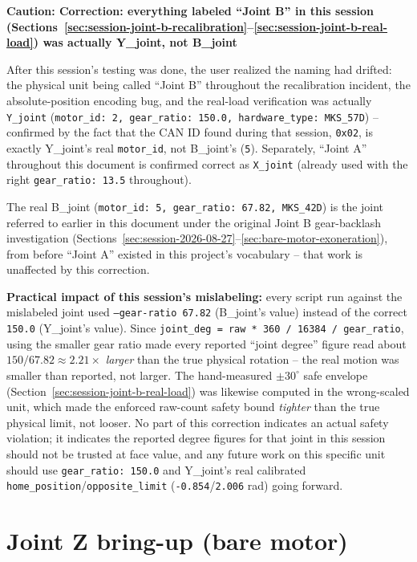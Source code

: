 \documentclass[11pt,letterpaper]{article}
\newenvironment{caution}[1]{%
    \par\addvspace{8pt}%
    \noindent{\color{cautionred}\rule{\linewidth}{0.8pt}}\par\vspace{2pt}
    \noindent\textbf{\color{cautionred}Caution: #1}\par\vspace{2pt}
}{%
    \par\vspace{2pt}\noindent{\color{cautionred}\rule{\linewidth}{0.4pt}}%
    \par\addvspace{8pt}%
}
\begin{document}
\begin{caution}{Correction: everything labeled ``Joint B'' in this session (Sections~\ref{sec:session-joint-b-recalibration}--\ref{sec:session-joint-b-real-load}) was actually Y\_joint, not B\_joint}
After this session's testing was done, the user realized the naming had drifted: the physical unit being called ``Joint B'' throughout the recalibration incident, the absolute-position encoding bug, and the real-load verification was actually \texttt{Y\_joint} (\texttt{motor\_id: 2, gear\_ratio: 150.0, hardware\_type: MKS\_57D}) -- confirmed by the fact that the CAN ID found during that session, \texttt{0x02}, is exactly Y\_joint's real \texttt{motor\_id}, not B\_joint's (\texttt{5}). Separately, ``Joint A'' throughout this document is confirmed correct as \texttt{X\_joint} (already used with the right \texttt{gear\_ratio: 13.5} throughout).

The real B\_joint (\texttt{motor\_id: 5, gear\_ratio: 67.82, MKS\_42D}) is the joint referred to earlier in this document under the original Joint B gear-backlash investigation (Sections~\ref{sec:session-2026-08-27}--\ref{sec:bare-motor-exoneration}), from before ``Joint A'' existed in this project's vocabulary -- that work is unaffected by this correction.

\textbf{Practical impact of this session's mislabeling:} every script run against the mislabeled joint used \texttt{--gear-ratio 67.82} (B\_joint's value) instead of the correct \texttt{150.0} (Y\_joint's value). Since \texttt{joint\_deg = raw \texttt{*} 360 / 16384 / gear\_ratio}, using the smaller gear ratio made every reported ``joint degree'' figure read about $150/67.82 \approx 2.21\times$ \emph{larger} than the true physical rotation -- the real motion was smaller than reported, not larger. The hand-measured $\pm 30^\circ$ safe envelope (Section~\ref{sec:session-joint-b-real-load}) was likewise computed in the wrong-scaled unit, which made the enforced raw-count safety bound \emph{tighter} than the true physical limit, not looser. No part of this correction indicates an actual safety violation; it indicates the reported degree figures for that joint in this session should not be trusted at face value, and any future work on this specific unit should use \texttt{gear\_ratio: 150.0} and Y\_joint's real calibrated \texttt{home\_position}/\texttt{opposite\_limit} (\texttt{-0.854}/\texttt{2.006} rad) going forward.
\end{caution}

\section{Joint Z bring-up (bare motor)}
\label{sec:session-joint-z}
\end{document}
